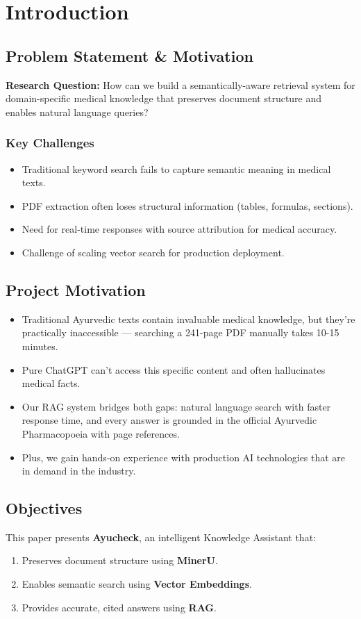 \documentclass[conference]{IEEEtran}
\begin{document}
\section{Introduction}

\subsection{Problem Statement \& Motivation}
\textbf{Research Question:} How can we build a semantically-aware retrieval system for domain-specific medical knowledge that preserves document structure and enables natural language queries?

\subsubsection{Key Challenges}
\begin{itemize}
    \item Traditional keyword search fails to capture semantic meaning in medical texts.
    \item PDF extraction often loses structural information (tables, formulas, sections).
    \item Need for real-time responses with source attribution for medical accuracy.
    \item Challenge of scaling vector search for production deployment.
\end{itemize}

\subsection{Project Motivation}
\begin{itemize}
    \item Traditional Ayurvedic texts contain invaluable medical knowledge, but they're practically inaccessible — searching a 241-page PDF manually takes 10-15 minutes.
    \item Pure ChatGPT can't access this specific content and often hallucinates medical facts.
    \item Our RAG system bridges both gaps: natural language search with faster response time, and every answer is grounded in the official Ayurvedic Pharmacopoeia with page references.
    \item Plus, we gain hands-on experience with production AI technologies that are in demand in the industry.
\end{itemize}

\subsection{Objectives}
This paper presents \textbf{Ayucheck}, an intelligent Knowledge Assistant that:
\begin{enumerate}
    \item Preserves document structure using \textbf{MinerU}.
    \item Enables semantic search using \textbf{Vector Embeddings}.
    \item Provides accurate, cited answers using \textbf{RAG}.
\end{enumerate}
\end{document}
